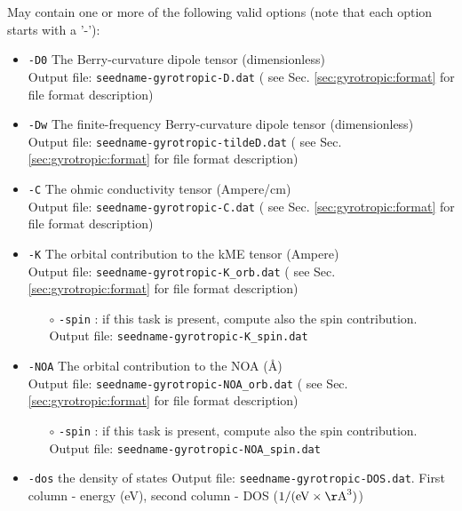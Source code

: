 May contain one or more of the following valid options (note that each option starts with a '-'):

\begin{itemize}

\item \verb#-D0#  The Berry-curvature dipole tensor  (dimensionless) \\
Output file: {\tt seedname-gyrotropic-D.dat}
( see Sec. \ref{sec:gyrotropic:format} for file format description)

\item \verb#-Dw# The finite-frequency  Berry-curvature dipole tensor  (dimensionless) \\
Output file: {\tt seedname-gyrotropic-tildeD.dat}
( see Sec. \ref{sec:gyrotropic:format} for file format description)


\item \verb#-C# The ohmic conductivity tensor  (Ampere/cm) \\
Output file: {\tt seedname-gyrotropic-C.dat}
( see Sec. \ref{sec:gyrotropic:format} for file format description)

\item \verb#-K# The orbital contribution to the kME tensor  (Ampere) \\
Output file: {\tt seedname-gyrotropic-K\_orb.dat}
( see Sec. \ref{sec:gyrotropic:format} for file format description)
    \begin{itemize}
	\item[$\circ$] \verb#-spin# : if this task is present, compute also the spin contribution.\\
	Output file: {\tt seedname-gyrotropic-K\_spin.dat}
    \end{itemize}

\item \verb#-NOA# The orbital contribution to the NOA  (\AA) \\
Output file: {\tt seedname-gyrotropic-NOA\_orb.dat}
( see Sec. \ref{sec:gyrotropic:format} for file format description)
    \begin{itemize}
	\item[$\circ$] \verb#-spin# : if this task is present, compute also the spin contribution. \\
	Output file: {\tt seedname-gyrotropic-NOA\_spin.dat}
    \end{itemize}

\item \verb#-dos# the density of states
Output file: {\tt seedname-gyrotropic-DOS.dat}. First column - energy (eV), second column - DOS ($1/(\mathrm{eV}\times\mathrm{\AA}^3)$)

\end{itemize}

